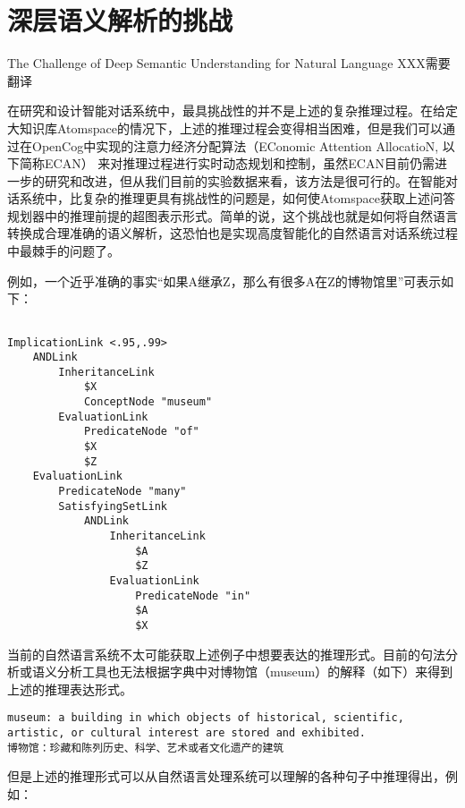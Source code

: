 \section{深层语义解析的挑战}{The Challenge of Deep Semantic Understanding for Natural Language}
XXX需要翻译

在研究和设计智能对话系统中，最具挑战性的并不是上述的复杂推理过程。在给定大知识库Atomspace的情况下，上述的推理过程会变得相当困难，但是我们可以通过在OpenCog中实现的注意力经济分配算法（EConomic Attention AllocatioN, 以下简称ECAN）\cite{Goertzel2010} 来对推理过程进行实时动态规划和控制，虽然ECAN目前仍需进一步的研究和改进，但从我们目前的实验数据来看，该方法是很可行的。在智能对话系统中，比复杂的推理更具有挑战性的问题是，如何使Atomspace获取上述问答规划器中的推理前提的超图表示形式。简单的说，这个挑战也就是如何将自然语言转换成合理准确的语义解析，这恐怕也是实现高度智能化的自然语言对话系统过程中最棘手的问题了。

例如，一个近乎准确的事实“如果A继承Z，那么有很多A在Z的博物馆里”可表示如下：

{\tt\begin{small}\begin{lstlisting}

ImplicationLink <.95,.99>
	ANDLink
		InheritanceLink
			$X
			ConceptNode "museum"
		EvaluationLink
			PredicateNode "of"
			$X
			$Z
	EvaluationLink
		PredicateNode "many"
		SatisfyingSetLink
			ANDLink
				InheritanceLink
					$A
					$Z
				EvaluationLink
					PredicateNode "in"
					$A
					$X

\end{lstlisting}\end{small}}

\noindent 当前的自然语言系统不太可能获取上述例子中想要表达的推理形式。目前的句法分析或语义分析工具也无法根据字典中对博物馆（museum）的解释（如下）来得到上述的推理表达形式。

\begin{verbatim}
museum: a building in which objects of historical, scientific, artistic, or cultural interest are stored and exhibited.
博物馆：珍藏和陈列历史、科学、艺术或者文化遗产的建筑
\end{verbatim}

\noindent 但是上述的推理形式可以从自然语言处理系统可以理解的各种句子中推理得出，例如：

